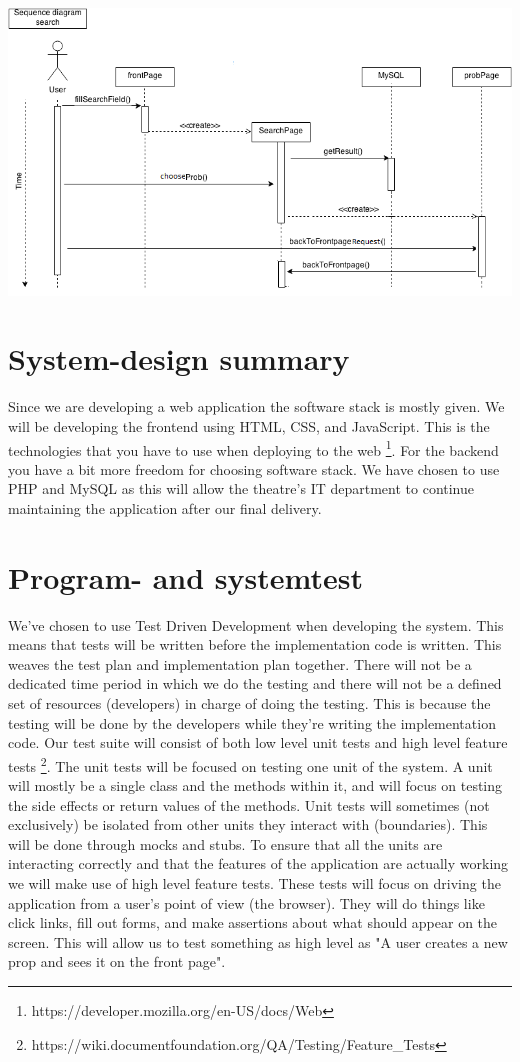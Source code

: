 \documentclass[12pt]{article}
\begin{document}
\includegraphics[scale=0.6]{sequenceDiagram_search.png}\\
\section{System-design summary}
Since we are developing a web application the software stack is mostly given. We will be developing the frontend using HTML, CSS, and JavaScript. This is the technologies that you have to use when deploying to the web \footnote{https://developer.mozilla.org/en-US/docs/Web}.
\newline
For the backend you have a bit more freedom for choosing software stack. We have chosen to use PHP and MySQL as this will allow the theatre's IT department to continue maintaining the application after our final delivery.
\section{Program- and systemtest}
We've chosen to use Test Driven Development when developing the system. This means that tests will be written before the implementation code is written. This weaves the test plan and implementation plan together. There will not be a dedicated time period in which we do the testing and there will not be a defined set of resources (developers) in charge of doing the testing. This is because the testing will be done by the developers while they're writing the implementation code.
\newline
Our test suite will consist of both low level unit tests and high level feature tests \footnote{https://wiki.documentfoundation.org/QA/Testing/Feature\_Tests}. The unit tests will be focused on testing one unit of the system. A unit will mostly be a single class and the methods within it, and will focus on testing the side effects or return values of the methods. Unit tests will sometimes (not exclusively) be isolated from other units they interact with (boundaries). This will be done through mocks and stubs.
\newline
\newline
To ensure that all the units are interacting correctly and that the features of the application are actually working we will make use of high level feature tests. These tests will focus on driving the application from a user's point of view (the browser). They will do things like click links, fill out forms, and make assertions about what should appear on the screen. This will allow us to test something as high level as "A user creates a new prop and sees it on the front page".
\end{document}

